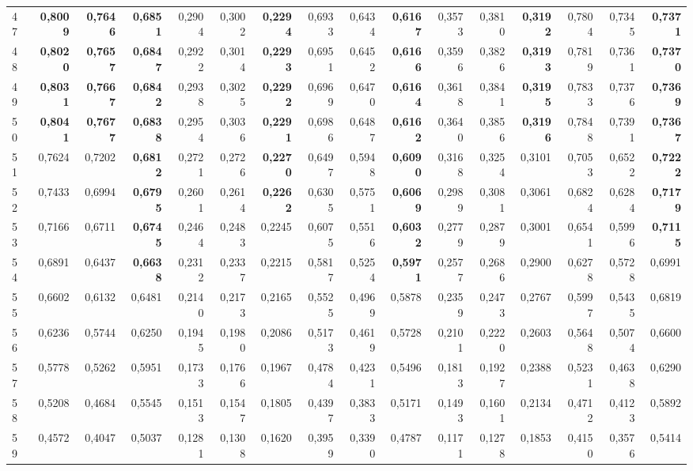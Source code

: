 \begin{table}[htp!]
\begin{adjustwidth}{-2cm}{}
\begin{tabular}{ l | *{15}{| r}}
47	&	\textbf{0,8009}	&	\textbf{0,7646}	&	\textbf{0,6851}	&	0,2904	&	0,3002	&	\textbf{0,2294}	&	0,6933	&	0,6434	&	\textbf{0,6167}	&	0,3573	&	0,3810	&	\textbf{0,3192}	&	0,7804	&	0,7345	&	\textbf{0,7371}	\\
48	&	\textbf{0,8020}	&	\textbf{0,7657}	&	\textbf{0,6847}	&	0,2922	&	0,3014	&	\textbf{0,2293}	&	0,6951	&	0,6452	&	\textbf{0,6166}	&	0,3596	&	0,3826	&	\textbf{0,3193}	&	0,7819	&	0,7361	&	\textbf{0,7370}	\\
49	&	\textbf{0,8031}	&	\textbf{0,7667}	&	\textbf{0,6842}	&	0,2938	&	0,3025	&	\textbf{0,2292}	&	0,6969	&	0,6470	&	\textbf{0,6164}	&	0,3618	&	0,3841	&	\textbf{0,3195}	&	0,7833	&	0,7376	&	\textbf{0,7369}	\\
50	&	\textbf{0,8041}	&	\textbf{0,7677}	&	\textbf{0,6838}	&	0,2954	&	0,3036	&	\textbf{0,2291}	&	0,6986	&	0,6487	&	\textbf{0,6162}	&	0,3640	&	0,3856	&	\textbf{0,3196}	&	0,7848	&	0,7391	&	\textbf{0,7367}	\\
51	&	0,7624	&	0,7202	&	\textbf{0,6812}	&	0,2721	&	0,2726	&	\textbf{0,2270}	&	0,6497	&	0,5948	&	\textbf{0,6090}	&	0,3168	&	0,3254	&	0,3101	&	0,7053	&	0,6522	&	\textbf{0,7222}	\\
52	&	0,7433	&	0,6994	&	\textbf{0,6795}	&	0,2601	&	0,2614	&	\textbf{0,2262}	&	0,6305	&	0,5751	&	\textbf{0,6069}	&	0,2989	&	0,3081	&	0,3061	&	0,6824	&	0,6284	&	\textbf{0,7179}	\\
53	&	0,7166	&	0,6711	&	\textbf{0,6745}	&	0,2464	&	0,2483	&	0,2245	&	0,6075	&	0,5516	&	\textbf{0,6032}	&	0,2779	&	0,2879	&	0,3001	&	0,6541	&	0,5996	&	\textbf{0,7115}	\\
54	&	0,6891	&	0,6437	&	\textbf{0,6638}	&	0,2312	&	0,2337	&	0,2215	&	0,5817	&	0,5254	&	\textbf{0,5971}	&	0,2577	&	0,2686	&	0,2900	&	0,6278	&	0,5728	&	0,6991	\\
55	&	0,6602	&	0,6132	&	0,6481	&	0,2140	&	0,2173	&	0,2165	&	0,5525	&	0,4969	&	0,5878	&	0,2359	&	0,2473	&	0,2767	&	0,5997	&	0,5435	&	0,6819	\\
56	&	0,6236	&	0,5744	&	0,6250	&	0,1945	&	0,1980	&	0,2086	&	0,5173	&	0,4619	&	0,5728	&	0,2101	&	0,2220	&	0,2603	&	0,5648	&	0,5074	&	0,6600	\\
57	&	0,5778	&	0,5262	&	0,5951	&	0,1733	&	0,1766	&	0,1967	&	0,4784	&	0,4231	&	0,5496	&	0,1813	&	0,1927	&	0,2388	&	0,5231	&	0,4638	&	0,6290	\\
58	&	0,5208	&	0,4684	&	0,5545	&	0,1513	&	0,1547	&	0,1805	&	0,4397	&	0,3833	&	0,5171	&	0,1493	&	0,1601	&	0,2134	&	0,4712	&	0,4123	&	0,5892	\\
59	&	0,4572	&	0,4047	&	0,5037	&	0,1281	&	0,1308	&	0,1620	&	0,3959	&	0,3390	&	0,4787	&	0,1171	&	0,1278	&	0,1853	&	0,4150	&	0,3576	&	0,5414	\\

\end{tabular}
\end{adjustwidth}
\end{table}
